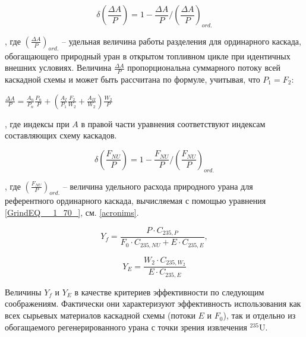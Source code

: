 {\begin{equation} \label{DeltaA} 
    \delta(\frac{\Delta A}{P})=1-\frac{\Delta A}{P}/(\frac{\Delta A}{P})_{ord.}
\end{equation}

, где $(\frac{\Delta A}{P})_{ord.}$ -- удельная величина работы разделения для ординарного каскада, обогащающего природный уран в открытом топливном цикле при идентичных внешних условиях. Величина $\frac{\Delta A}{P}$ пропорциональна суммарного потоку всей каскадной схемы и может быть рассчитана по формуле, учитывая, что ${P_1}={F_2}$:

$\frac{\Delta A}{P} = \frac{A_n}{P_n} \frac{P_n}{P}+\left(\frac{A_I}{P_1} \frac{F_2}{W_2}+\frac{A_{II}}{W_2}\right) \frac{W_2}{P}$

, где индексы при $A$ в правой части уравнения соответствуют индексам составляющих схему каскадов.

\begin{equation} \label{DeltaFnu} 
\delta(\frac{F_{NU}}{P})=1-\frac{F_{NU}}{P}/(\frac{F_{NU}}{P})_{ord.}
\end{equation} 

, где $(\frac{F_{NU}}{P})_{ord.}$ -- величина удельного расхода природного урана для референтного ординарного каскада, вычисляемая с помощью уравнения \ref{GrindEQ__1_70_}, см. \ref{acronims}.

\begin{equation} \label{Rec2} 
    Y_f = \frac{P \cdot C_{235,P}}{F_0 \cdot C_{235,NU} + E \cdot C_{235,E}}, 
\end{equation} 

\begin{equation} \label{RecR2} 
    Y_{E} = \frac{W_2\cdot C_{235,W_2}}{E \cdot C_{235,E}}        
\end{equation} 

Величины $Y_f$ и $Y_{E}$ в качестве критериев эффективности по следующим соображениям. Фактически они характеризуют эффективность использования как всех сырьевых материалов каскадной схемы (потоки $E$ и $F_0$), так и отдельно из обогащаемого регенерированного урана с точки зрения извлечения $^{235}$U.

}
